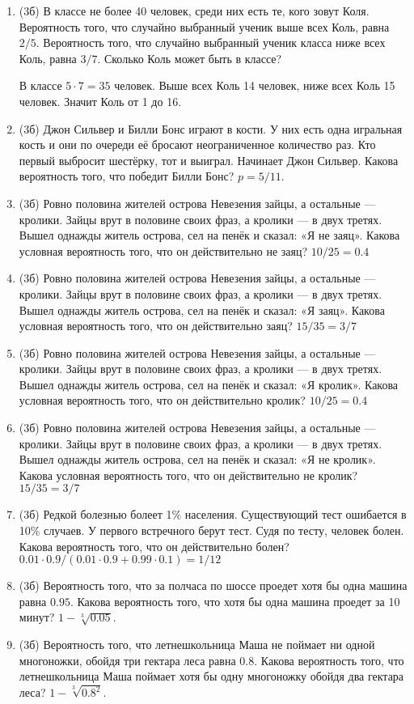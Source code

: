 \documentclass[a4paper, 12pt]{article}
\begin{document}
\newpage
\begin{enumerate}
\item (3б) В классе не более 40 человек, среди них есть те, кого зовут Коля. Вероятность того, что случайно выбранный ученик выше всех Коль, равна $2/5$. Вероятность того, что случайно выбранный ученик класса ниже всех Коль, равна $3/7$. Сколько Коль может быть в классе?

В классе $5\cdot 7=35$ человек. Выше всех Коль 14 человек, ниже всех Коль 15 человек. Значит Коль от 1 до 16.
\item (3б) Джон Сильвер и Билли Бонс играют в кости. У них есть одна игральная кость и они по очереди её бросают неограниченное количество раз. Кто первый выбросит шестёрку, тот и выиграл. Начинает Джон Сильвер. Какова вероятность того, что победит Билли Бонс? $p=5/11$.
\item (3б) Ровно половина жителей острова Невезения зайцы, а остальные — кролики. Зайцы врут в половине своих фраз, а кролики — в двух третях. Вышел однажды житель острова, сел на пенёк и сказал: «Я не заяц». Какова условная вероятность того, что он действительно не заяц? $10/25=0.4$
\item (3б) Ровно половина жителей острова Невезения зайцы, а остальные — кролики. Зайцы врут в половине своих фраз, а кролики — в двух третях. Вышел однажды житель острова, сел на пенёк и сказал: «Я заяц». Какова условная вероятность того, что он действительно заяц? $15/35=3/7$
\item (3б) Ровно половина жителей острова Невезения зайцы, а остальные — кролики. Зайцы врут в половине своих фраз, а кролики — в двух третях. Вышел однажды житель острова, сел на пенёк и сказал: «Я кролик». Какова условная вероятность того, что он действительно кролик? $10/25=0.4$
\item (3б) Ровно половина жителей острова Невезения зайцы, а остальные — кролики. Зайцы врут в половине своих фраз, а кролики — в двух третях. Вышел однажды житель острова, сел на пенёк и сказал: «Я не кролик». Какова условная вероятность того, что он действительно не кролик? $15/35=3/7$
\item (3б) Редкой болезнью болеет 1\% населения. Существующий тест ошибается в 10\% случаев. У первого встречного берут тест. Судя по тесту, человек болен. Какова вероятность того, что он действительно болен? $0.01\cdot 0.9/(0.01 \cdot 0.9 + 0.99 \cdot 0.1)=1/12$
\item (3б) Вероятность того, что за полчаса по шоссе проедет хотя бы одна машина равна $0.95$. 
Какова вероятность того, что хотя бы одна машина проедет за 10 минут? $1 - \sqrt[3]{0.05}$.
\item (3б) Вероятность того, что летнешкольница Маша не поймает ни одной многоножки, обойдя три гектара леса равна $0.8$. 
Какова вероятность того, что летнешкольница Маша поймает хотя бы одну многоножку обойдя два гектара леса? $1 - \sqrt[3]{0.8^2}$. 


\end{enumerate}
\end{document}
